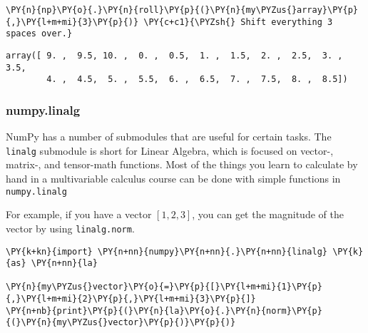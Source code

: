     \begin{tcolorbox}[breakable, size=fbox, boxrule=1pt, pad at break*=1mm,colback=cellbackground, colframe=cellborder]
\begin{Verbatim}[commandchars=\\\{\}]
\PY{n}{np}\PY{o}{.}\PY{n}{roll}\PY{p}{(}\PY{n}{my\PYZus{}array}\PY{p}{,}\PY{l+m+mi}{3}\PY{p}{)} \PY{c+c1}{\PYZsh{} Shift everything 3 spaces over.}
\end{Verbatim}
\end{tcolorbox}

            \begin{tcolorbox}[breakable, size=fbox, boxrule=.5pt, pad at break*=1mm, opacityfill=0]
\begin{Verbatim}[commandchars=\\\{\}]
array([ 9. ,  9.5, 10. ,  0. ,  0.5,  1. ,  1.5,  2. ,  2.5,  3. ,  3.5,
        4. ,  4.5,  5. ,  5.5,  6. ,  6.5,  7. ,  7.5,  8. ,  8.5])
\end{Verbatim}
\end{tcolorbox}
        
    \hypertarget{numpy.linalg}{%
\subsubsection{numpy.linalg}\label{numpy.linalg}}

NumPy has a number of submodules that are useful for certain tasks. The
\texttt{linalg} submodule is short for Linear Algebra, which is focused
on vector-, matrix-, and tensor-math functions. Most of the things you
learn to calculate by hand in a multivariable calculus course can be
done with simple functions in \texttt{numpy.linalg}

For example, if you have a vector \([1,2,3]\), you can get the magnitude
of the vector by using \texttt{linalg.norm}.

    \begin{tcolorbox}[breakable, size=fbox, boxrule=1pt, pad at break*=1mm,colback=cellbackground, colframe=cellborder]
\begin{Verbatim}[commandchars=\\\{\}]
\PY{k+kn}{import} \PY{n+nn}{numpy}\PY{n+nn}{.}\PY{n+nn}{linalg} \PY{k}{as} \PY{n+nn}{la}

\PY{n}{my\PYZus{}vector}\PY{o}{=}\PY{p}{[}\PY{l+m+mi}{1}\PY{p}{,}\PY{l+m+mi}{2}\PY{p}{,}\PY{l+m+mi}{3}\PY{p}{]}
\PY{n+nb}{print}\PY{p}{(}\PY{n}{la}\PY{o}{.}\PY{n}{norm}\PY{p}{(}\PY{n}{my\PYZus{}vector}\PY{p}{)}\PY{p}{)}
\end{Verbatim}
\end{tcolorbox}


